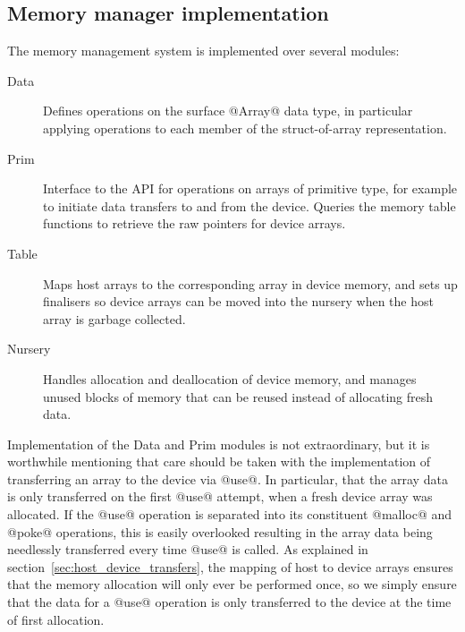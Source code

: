 % 

\subsection{Memory manager implementation}

The memory management system is implemented over several modules:
%
\begin{description}
\item[Data] Defines operations on the surface @Array@ data type, in
    particular applying operations to each member of the struct-of-array
    representation.

\item[Prim] Interface to the \CUDA API for operations on arrays of primitive
    type, for example to initiate data transfers to and from the device. Queries
    the memory table functions to retrieve the raw pointers for device arrays.

\item[Table] Maps host arrays to the corresponding array in device memory, and
    sets up finalisers so device arrays can be moved into the nursery when the
    host array is garbage collected.

\item[Nursery] Handles allocation and deallocation of device memory, and
    manages unused blocks of memory that can be reused instead of allocating
    fresh data.
\end{description}

Implementation of the Data and Prim modules is not extraordinary, but it is
worthwhile mentioning that care should be taken with the implementation of
transferring an array to the device via @use@. In particular, that the
array data is only transferred on the first @use@ attempt, when a fresh
device array was allocated. If the @use@ operation is separated into its
constituent @malloc@ and @poke@ operations, this is easily overlooked
resulting in the array data being needlessly transferred every time @use@
is called. As explained in section~\ref{sec:host_device_transfers}, the mapping
of host to device arrays ensures that the memory allocation will only ever be
performed once, so we simply ensure that the data for a @use@ operation is
only transferred to the device at the time of first allocation.

